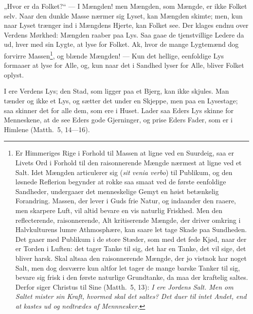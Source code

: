 \documentclass[12pt,a4paper]{book}
\begin{document}
„Hvor er da Folket?“ --- I Mængden! men Mængden, som Mængde, er ikke Folket selv. Naar den
dunkle Masse nærmer sig Lyset, kan Mængden skimte; men, kun naar Lyset trænger ind i
Mængdens Hjerte, kan Folket see. Der klages endnu over Verdens Mørkhed: Mængden raaber paa
Lys. Saa gaae de tjenstvillige Ledere da ud, hver med sin Lygte, at lyse for Folket. Ak,
hvor de mange Lygtemænd dog forvirre Massen\footnote{%
Er Himmeriges Rige i Forhold til Massen at ligne ved en Suurdeig, saa er Livets Ord i
Forhold til den raisonnerende Mængde nærmest at ligne ved et Salt. Idet Mængden
articulerer sig (\textit{sit venia verbo}) til Publikum, og den løsnede Reflerion begynder
at rokke saa smaat ved de første eenfoldige Sandheder, undergaaer det menneskelige Gemyt
en høist betænkelig Forandring. Massen, der lever i Guds frie Natur, og indaander den
raaere, men skarpere Luft, vil altid bevare en vis naturlig Friskhed. Men den
reflecterende, raisonnerende, Alt kritiserende Mængde, der driver omkring i Halvkulturens
lumre Athmosphære, kan saare let tage Skade paa Sundheden. Det gaaer med Publikum i de
store Stæder, som med det fede Kjød, naar der er Torden i Luften: det tager Tanke til sig,
det har en Tanke, det vil sige, det bliver harsk. Skal altsaa den raisonnerende Mængde,
der jo vistnok har noget Salt, men dog desværre kun altfor let tager de mange barske
Tanker til sig, bevare sig frisk i den første naturlige Grundtanke, da maa der kraftelig
saltes. Derfor siger Christus til Sine (Matth.\ 5, 13): \emph{I ere Jordens Salt. Men om
Saltet mister sin Kraft, hvormed skal det saltes? Det duer til intet Andet, end at kastes
ud og nedtrædes af Mennnesker.}%
}, og blænde
Mængden! --- Kun det hellige, eenfoldige Lys formaaer at lyse for Alle, og, kun naar det i
Sandhed lyser for Alle, bliver Folket oplyst.

\begingroup\large
I ere Verdens Lys; den Stad, som ligger paa et Bjerg, kan ikke skjules. Man tænder og ikke
et Lys, og sætter det under en Skjeppe, men paa en Lysestage; saa skinner det for alle
dem, som ere i Huset. Lader saa Eders Lys skinne for Menneskene, at de see Eders gode
Gjerninger, og prise Eders Fader, som er i Himlene (Matth.\ 5, 14---16).
\par\endgroup
\end{document}

